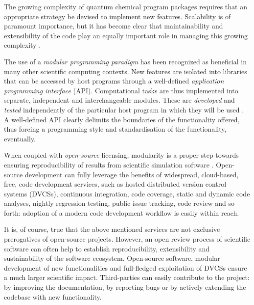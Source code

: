 The growing complexity of quantum chemical program packages requires
that an appropriate strategy be devised to implement new features.
Scalability is of paramount importance, but it has become clear
that maintainability and extensibility of the code play an equally
important role in managing this growing complexity \cite{Wilson2014}.

The use of a \emph{modular programming paradigm} has been recognized as
beneficial in many other scientific computing contexts. New features are
isolated into libraries that can be accessed by host programs through a
well-defined \emph{application programming interface} (API).
Computational tasks are thus implemented into separate, independent and
interchangeable modules. These are \emph{developed} and \emph{tested}
independently of the particular host program in which they will be used
\cite{Dijkstra1968, Parnas1972}.  A well-defined API clearly delimits
the boundaries of the functionality offered, thus forcing a programming
style and standardisation of the functionality, eventually.

When coupled with \emph{open-source} licensing, modularity is a proper
step towards ensuring reproducibility of results from scientific
simulation software \cite{Gezelter2015}.
Open-source development can fully leverage the benefits
of widespread, cloud-based, free, code development services, such as
hosted distributed version control systems (DVCSs), continuous integration, code
coverage, static and dynamic code analyses, nightly regression testing,
public issue tracking, code review and so forth:
adoption of a modern code development workflow is easily within reach.

It is, of course, true that the above mentioned services are not
exclusive prerogatives of open-source projects.
However, an open review process of scientific software can often help
to establish
reproducibility, extensibility and sustainability of the software
ecosystem.
Open-source software, modular development of new functionalities
and full-fledged exploitation of DVCSs ensure a much larger scientific
impact. Third-parties can easily contribute to
the project: by improving the documentation, by reporting bugs or
by actively extending the codebase with new functionality.

